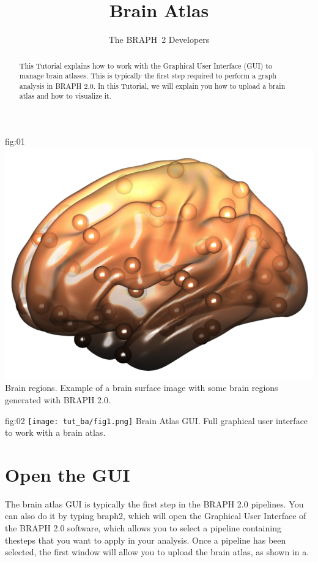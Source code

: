 \documentclass[justified]{tufte-handout}
\title{Brain Atlas}
\author[The BRAPH~2 Developers]{The BRAPH~2 Developers}
\begin{document}
\maketitle
	
	{fig:01}
	{\includegraphics{tut_ba/fig0.png}}
	{Brain regions.}
	{
	Example of a brain surface image with some brain regions generated with BRAPH 2.0.
	}

\begin{abstract}
\noindent
This Tutorial explains how to work with the Graphical User Interface (GUI) to manage brain atlases.
This is typically the first step required to perform a graph analysis in BRAPH 2.0. 
In this Tutorial, we will explain you how to upload a brain atlas and how to visualize it.
\end{abstract}

\tableofcontents

	{fig:02}
	{\texttt{[image: tut\_ba/fig1.png]}}
	{Brain Atlas GUI.}
	{
	Full graphical user interface to work with a brain atlas. 
	}

\clearpage
\section{Open the GUI}

The brain atlas GUI is typically the first step in the BRAPH 2.0 pipelines. You can also do it by typing braph2, which will open the Graphical User Interface of the BRAPH 2.0 software, which allows you to select a pipeline containing thesteps that you want to apply in your analysis. Once a pipeline has been selected, the first window will allow you to upload the brain atlas, as shown in a.
\end{document}
